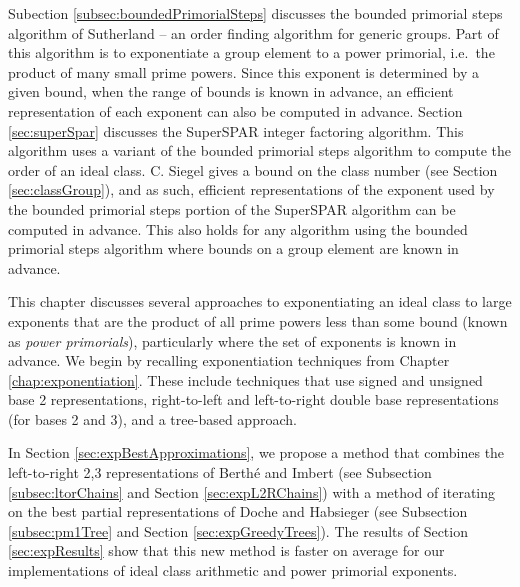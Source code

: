 \documentclass{ucalgthes1}
\theoremstyle{definition}
\begin{document}
Subection \ref{subsec:boundedPrimorialSteps} discusses the bounded primorial steps algorithm of Sutherland \cite[\S 4.1]{Sutherland2007} -- an order finding algorithm for generic groups.  Part of this algorithm is to exponentiate a group element to a power primorial, i.e.\ the product of many small prime powers.  Since this exponent is determined by a given bound, when the range of bounds is known in advance, an efficient representation of each exponent can also be computed in advance.  Section \ref{sec:superSpar} discusses the SuperSPAR integer factoring algorithm.  This algorithm uses a variant of the bounded primorial steps algorithm to compute the order of an ideal class.  C. Siegel \cite[p.247]{Crandall2001} gives a bound on the class number (see Section \ref{sec:classGroup}), and as such, efficient representations of the exponent used by the bounded primorial steps portion of the SuperSPAR algorithm can be computed in advance.  This also holds for any algorithm using the bounded primorial steps algorithm where bounds on a group element are known in advance.

This chapter discusses several approaches to exponentiating an ideal class to large exponents that are the product of all prime powers less than some bound (known as \emph{power primorials}), particularly where the set of exponents is known in advance.  We begin by recalling exponentiation techniques from Chapter \ref{chap:exponentiation}.  These include techniques that use signed and unsigned base 2 representations, right-to-left and left-to-right double base representations (for bases 2 and 3), and a tree-based approach.  

In Section \ref{sec:expBestApproximations}, we propose a method that combines the left-to-right 2,3 representations of Berth{\'e} and Imbert \cite{Berthe2009} (see Subsection \ref{subsec:ltorChains} and Section \ref{sec:expL2RChains}) with a method of iterating on the best partial representations of Doche and Habsieger \cite{Doche2008} (see Subsection \ref{subsec:pm1Tree} and Section \ref{sec:expGreedyTrees}).  The results of Section \ref{sec:expResults} show that this new method is faster on average for our implementations of ideal class arithmetic and power primorial exponents.
\end{document}
